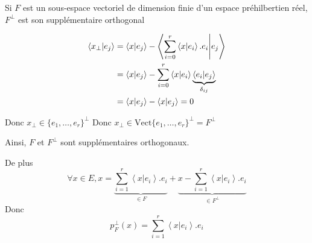 \documentclass{article}
\begin{document}
\begin{question_kholle}{Si $F$ est un sous-espace vectoriel de dimension finie d'un espace préhilbertien réel, $F^{\perp}$ est son supplémentaire orthogonal}
\begin{itemize}[label=$\lozenge$]
\begin{itemize}[label=$\star$]
			\begin{align*}
				\braket{ x_{\perp} | e_{j} } &= \braket{ x | e_{j} }  - \left\langle  \sum_{i=0}^{r}\braket{ x | e_{i} } .e_{i} \Bigg|  e_{j} \right\rangle \\
				&= \left\langle x | e_{j} \right\rangle - \sum_{i=0}^{r} \left\langle x | e_{i} \right\rangle\underbrace{  \left\langle e_{i} | e_{j} \right\rangle  }_{ \delta_{ij} } \\
				&= \left\langle x | e_{j} \right\rangle  - \left\langle x | e_{j} \right\rangle  = 0
			\end{align*}
			
			
			Donc $x_{\perp} \in \{e_{1}, \dots, e_{r}\}^{\perp}$
			Donc $x_{\perp} \in \text{Vect}\{ e_{1}, \dots, e_{r} \}^{\perp} = F^{\perp}$
			
		\end{itemize}
	\end{itemize}
	Ainsi, $F$ et $F^{\perp}$ sont supplémentaires orthogonaux.
	
	De plus
	$$	\forall x \in E, x = \underbrace{ \sum_{i=1}^{r}\left\langle x | e_{i} \right\rangle .e_{i} }_{ \in F } + \underbrace{x - \sum_{i=1}^{r}\left\langle x | e_{i} \right\rangle .e_{i}  }_{ \in F^{\perp} }$$
	Donc $$p_{F}^{\perp}(x) = \sum_{i=1}^{r}\left\langle x | e_{i} \right\rangle .e_{i} $$
	
\end{question_kholle}
\end{document}
